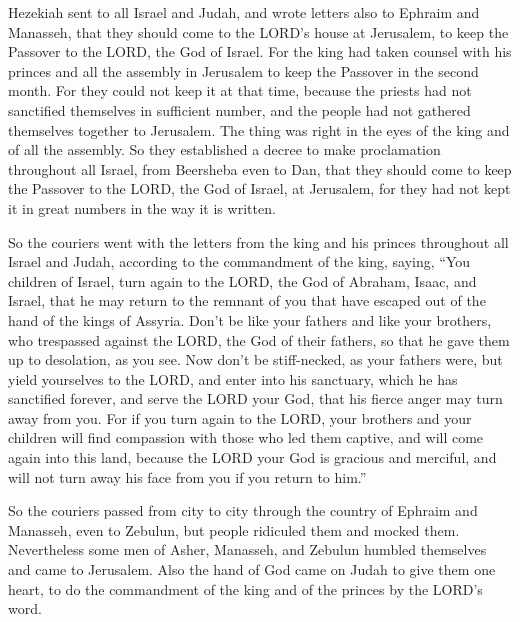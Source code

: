  Hezekiah sent to all Israel and Judah, and wrote letters
also to Ephraim and Manasseh, that they should come to the LORD's house
at Jerusalem, to keep the Passover to the LORD, the God of Israel.
 For the king had taken counsel with his princes and all the
assembly in Jerusalem to keep the Passover in the second month.
 For they could not keep it at that time, because the
priests had not sanctified themselves in sufficient number, and the
people had not gathered themselves together to Jerusalem. 
The thing was right in the eyes of the king and of all the assembly.
 So they established a decree to make proclamation
throughout all Israel, from Beersheba even to Dan, that they should come
to keep the Passover to the LORD, the God of Israel, at Jerusalem, for
they had not kept it in great numbers in the way it is written.

 So the couriers went with the letters from the king and his
princes throughout all Israel and Judah, according to the commandment of
the king, saying, ``You children of Israel, turn again to the LORD, the
God of Abraham, Isaac, and Israel, that he may return to the remnant of
you that have escaped out of the hand of the kings of Assyria.
 Don't be like your fathers and like your brothers, who
trespassed against the LORD, the God of their fathers, so that he gave
them up to desolation, as you see.  Now don't be
stiff-necked, as your fathers were, but yield yourselves to the LORD,
and enter into his sanctuary, which he has sanctified forever, and serve
the LORD your God, that his fierce anger may turn away from you.
 For if you turn again to the LORD, your brothers and your
children will find compassion with those who led them captive, and will
come again into this land, because the LORD your God is gracious and
merciful, and will not turn away his face from you if you return to
him.''

 So the couriers passed from city to city through the
country of Ephraim and Manasseh, even to Zebulun, but people ridiculed
them and mocked them.  Nevertheless some men of Asher,
Manasseh, and Zebulun humbled themselves and came to Jerusalem.
 Also the hand of God came on Judah to give them one heart,
to do the commandment of the king and of the princes by the LORD's word.

